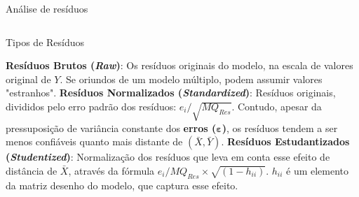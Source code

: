 \documentclass{beamer}\usepackage[]{graphicx}\usepackage[]{color}
\newenvironment{knitrout}{}{} %
\renewenvironment{knitrout}{\setlength{\topsep}{0mm}}{}
\begin{document}
\begin{frame}{Análise de resíduos}
\begin{columns}[c]
\begin{knitrout}
\end{knitrout}
\end{columns}

\end{frame}

\begin{frame}{Tipos de Resíduos}
\footnotesize

\textbf{Resíduos Brutos (\emph{Raw})}: Os resíduos originais do modelo, na escala de valores original de $Y$. Se oriundos de um modelo múltiplo, podem assumir valores "estranhos".
\vfill
\textbf{Resíduos Normalizados (\emph{Standardized})}: Resíduos originais, divididos pelo erro padrão dos resíduos: $e_i / \sqrt{MQ_{Res}}$. Contudo, apesar da pressuposição de variância constante dos \textbf{erros ($\mathbf{\varepsilon}$)}, os resíduos tendem a ser menos confiáveis quanto mais distante de $(\bar{X},\bar{Y})$.  \pause
\vfill
\textbf{Resíduos Estudantizados (\emph{Studentized})}: Normalização dos resíduos que leva em conta esse efeito de distância de $\bar{X}$, através da fórmula $e_i / MQ_{Res} \times \sqrt{(1 - h_{ii})}$. $h_{ii}$ é um elemento da matriz desenho do modelo, que captura esse efeito.

\end{frame}
\end{document}
